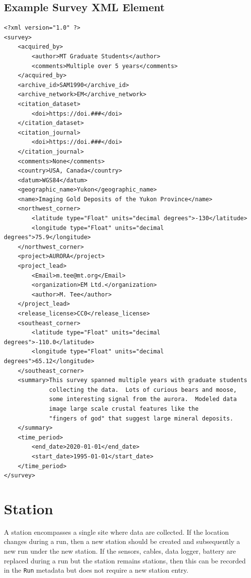 \documentclass[12pt]{article}
\begin{document}
\clearpage
\newpage
\subsection{Example Survey XML Element}

\begin{verbatim}
<?xml version="1.0" ?>
<survey>
    <acquired_by>
        <author>MT Graduate Students</author>
        <comments>Multiple over 5 years</comments>
    </acquired_by>
    <archive_id>SAM1990</archive_id>
    <archive_network>EM</archive_network>
    <citation_dataset>
        <doi>https://doi.###</doi>
    </citation_dataset>
    <citation_journal>
        <doi>https://doi.###</doi>
    </citation_journal>
    <comments>None</comments>
    <country>USA, Canada</country>
    <datum>WGS84</datum>
    <geographic_name>Yukon</geographic_name>
    <name>Imaging Gold Deposits of the Yukon Province</name>
    <northwest_corner>
        <latitude type="Float" units="decimal degrees">-130</latitude>
        <longitude type="Float" units="decimal degrees">75.9</longitude>
    </northwest_corner>
    <project>AURORA</project>
    <project_lead>
        <Email>m.tee@mt.org</Email>
        <organization>EM Ltd.</organization>
        <author>M. Tee</author>
    </project_lead>
    <release_license>CC0</release_license>
    <southeast_corner>
        <latitude type="Float" units="decimal degrees">-110.0</latitude>
        <longitude type="Float" units="decimal degrees">65.12</longitude>
    </southeast_corner>
    <summary>This survey spanned multiple years with graduate students
             collecting the data.  Lots of curious bears and moose,
             some interesting signal from the aurora.  Modeled data
             image large scale crustal features like the 
             "fingers of god" that suggest large mineral deposits.
    </summary>
    <time_period>
        <end_date>2020-01-01</end_date>
        <start_date>1995-01-01</start_date>
    </time_period>
</survey>
\end{verbatim}

\clearpage
\newpage
\section{Station}

A station encompasses a single site where data are collected. If the location changes during a run, then a new station should be created and subsequently a new run under the new station. If the sensors, cables, data logger, battery are replaced during a run but the station remains stations, then this can be recorded in the \verb|Run| metadata but does not require a new station entry.
\end{document}
